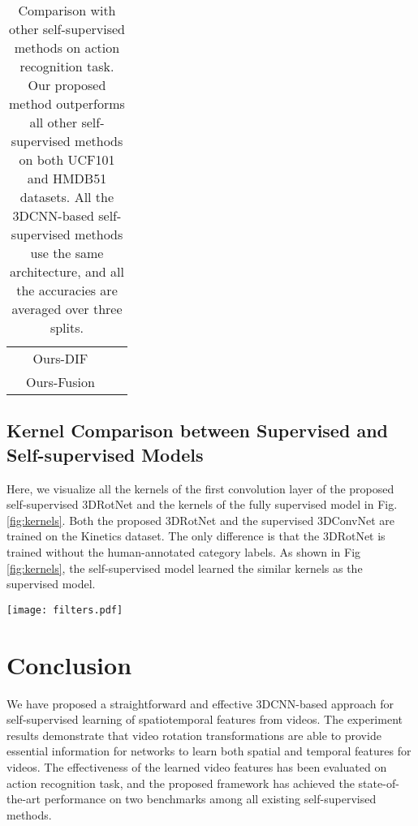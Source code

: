 \documentclass[10pt,twocolumn,letterpaper]{article}
\begin{document}
\begin{table}[t]
\begin{center}
\begin{tabular}{c|c|c|c}
&Ours-DIF       &  &\\
&Ours-Fusion    &  &\\
\hline
\end{tabular}
\vspace{3mm}
\caption{Comparison with other self-supervised methods on  action recognition task. Our proposed method outperforms all other self-supervised methods on both UCF101 and HMDB51 datasets. All the 3DCNN-based self-supervised methods use the same architecture, and all the accuracies are averaged over three splits.}
\label{tab:compare}
\end{center}
\vspace{-4mm}
\end{table}



\subsection{Kernel Comparison between Supervised and Self-supervised Models}

Here, we visualize all the kernels of the first convolution layer of the proposed self-supervised 3DRotNet and the kernels of the fully supervised model in Fig. \ref{fig:kernels}. Both the proposed 3DRotNet and the supervised 3DConvNet are trained on the Kinetics dataset. The only difference is that the 3DRotNet is trained without the human-annotated category labels. As shown in Fig \ref{fig:kernels}, the self-supervised model learned the similar kernels as the supervised model.

\begin{figure*}[!ht]
\begin{center}
\texttt{[image: filters.pdf]}
\end{center}
\vspace{-10pt}
\caption{All the kernels of the first convolution block of our self-supervised 3DRotNet and fully supervised 3DResNet.}
\vspace{-10pt}
\label{fig:kernels}
\end{figure*}

\section{Conclusion}

We have proposed a straightforward and effective 3DCNN-based approach for self-supervised learning of spatiotemporal features from videos. The experiment results demonstrate that video rotation transformations are able to provide essential information for networks to learn both spatial and temporal features for videos. The effectiveness of the learned video features has been evaluated on action recognition task, and the proposed framework has achieved the state-of-the-art performance on two benchmarks among all existing self-supervised methods.
\end{document}
